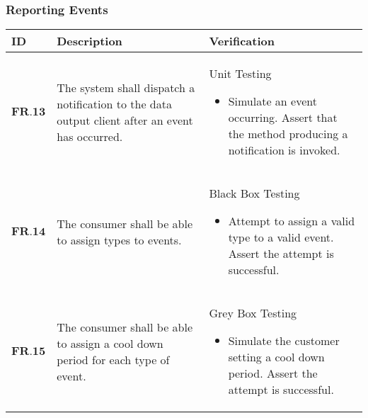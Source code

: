 \subsubsection{Reporting Events}
\begin{longtable}[H]{| p{1.5cm}| p{4.5cm}| p{10.5cm}|}
        \hline
        \cellcolor{titleColor}\textbf{ID}    & \cellcolor{titleColor}\textbf{Description}                                                                                                                                              & \cellcolor{titleColor}\textbf{Verification}                                                                                                                                                                                                                                                                                                                                      \\ \hline
        $\textbf{FR.13}$ & The system shall dispatch a notification to the data output client after an event has occurred.                                                                  & Unit Testing\begin{itemize}\item Simulate an event occurring. Assert that the method producing a notification is invoked.\end{itemize}                                                                                                                                                                                                               \\ \hline
        $\textbf{FR.14}$ & The consumer shall be able to assign types to events.                                                                                                            & Black Box Testing\begin{itemize}\item Attempt to assign a valid type to a valid event. Assert the attempt is successful.\end{itemize}                                                                                                                                                                                                                \\ \hline
        $\textbf{FR.15}$ & The consumer shall be able to assign a cool down period for each type of event.                                                                                  & Grey Box Testing\begin{itemize}\item Simulate the customer setting a cool down period. Assert the attempt is successful.\end{itemize}                                                                                                                                                                                                                \\ \hline

\end{longtable}
